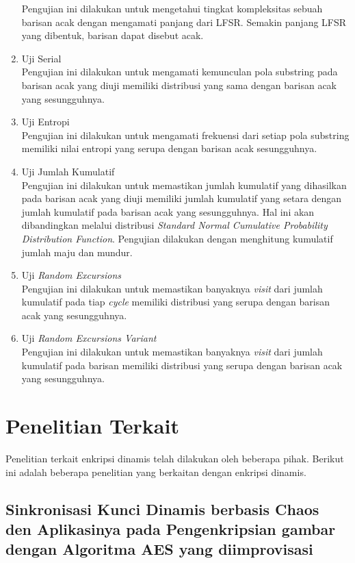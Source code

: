 \begin{enumerate}
  Pengujian ini dilakukan untuk mengetahui tingkat kompleksitas sebuah barisan acak dengan mengamati panjang dari LFSR. Semakin panjang LFSR yang dibentuk, barisan dapat disebut acak.
  \item Uji Serial \\
  Pengujian ini dilakukan untuk mengamati kemunculan pola substring pada barisan acak yang diuji memiliki distribusi yang sama dengan barisan acak yang sesungguhnya.
  \item Uji Entropi \\
  Pengujian ini dilakukan untuk mengamati frekuensi dari setiap pola substring memiliki nilai entropi yang serupa dengan barisan acak sesungguhnya.
  \item Uji Jumlah Kumulatif \\
  Pengujian ini dilakukan untuk memastikan jumlah kumulatif yang dihasilkan pada barisan acak yang diuji memiliki jumlah kumulatif yang setara dengan jumlah kumulatif pada barisan acak yang sesungguhnya. Hal ini akan dibandingkan melalui distribusi \emph{Standard Normal Cumulative Probability Distribution Function}. Pengujian dilakukan dengan menghitung kumulatif jumlah maju dan mundur.
  \item Uji \emph{Random Excursions} \\
  Pengujian ini dilakukan untuk memastikan banyaknya \emph{visit} dari jumlah kumulatif pada tiap \emph{cycle} memiliki distribusi yang serupa dengan barisan acak yang sesungguhnya.
  \item Uji \emph{Random Excursions Variant} \\
  Pengujian ini dilakukan untuk memastikan banyaknya \emph{visit} dari jumlah kumulatif pada barisan memiliki distribusi yang serupa dengan barisan acak yang sesungguhnya.
\end{enumerate}


\section{Penelitian Terkait}

Penelitian terkait enkripsi dinamis telah dilakukan oleh beberapa pihak. Berikut ini adalah beberapa penelitian yang berkaitan dengan enkripsi dinamis. 

\subsection{Sinkronisasi Kunci Dinamis berbasis Chaos den Aplikasinya pada Pengenkripsian gambar dengan Algoritma AES yang diimprovisasi}

